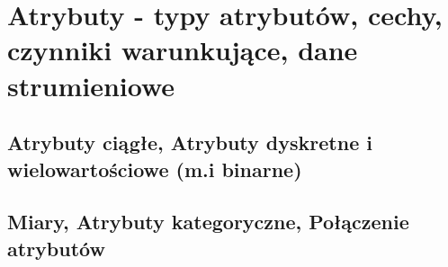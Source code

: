 \section{Atrybuty - typy atrybutów, cechy, czynniki warunkujące, dane strumieniowe}
\subsection{Atrybuty ciągłe, Atrybuty dyskretne i wielowartościowe (m.i binarne)}
\subsection{Miary, Atrybuty kategoryczne, Połączenie atrybutów}
